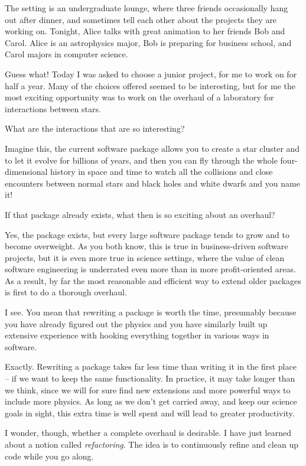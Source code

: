 The setting is an undergraduate lounge, where three friends occasionally
hang out after dinner, and sometimes tell each other about the projects
they are working on.  Tonight, Alice talks with great animation to her
friends Bob and Carol.  Alice is an astrophysics major, Bob is preparing
for business school, and Carol majors in computer science.

\abc

\alice
Guess what!  Today I was asked to choose a junior project, for
me to work on for half a year.  Many of the choices offered seemed to
be interesting, but for me the most exciting opportunity was to work
on the overhaul of a laboratory for interactions between stars.

\bob
What are the interactions that are so interesting?

\alice
Imagine this, the current software package allows you to create
a star cluster and to let it evolve for billions of years, and then
you can fly through the whole four-dimensional history in space and
time to watch all the collisions and close encounters between normal
stars and black holes and white dwarfs and you name it!

\carol
If that package already exists, what then is so exciting about
an overhaul?

\alice
Yes, the package exists, but every large software package tends
to grow and to become overweight.  As you both know, this is true in
business-driven software projects, but it is even more true in science
settings, where the value of clean software engineering is underrated
even more than in more profit-oriented areas.  As a result, by far
the most reasonable and efficient way to extend older packages is first
to do a thorough overhaul.

\bob
I see.  You mean that rewriting a package is worth the time,
presumably because you have already figured out the physics and you
have similarly built up extensive experience with hooking everything
together in various ways in software.

\alice
Exactly.  Rewriting a package takes far less time than writing
it in the first place -- if we want to keep the same functionality.
In practice, it may take longer than we think, since we will for sure
find new extensions and more powerful ways to include more physics.
As long as we don't get carried away, and keep our science goals in
sight, this extra time is well spent and will lead to greater
productivity.

\carol
I wonder, though, whether a complete overhaul is desirable.  I
have just learned about a notion called {\it refactoring}.  The idea
is to continuously refine and clean up code while you go along.

